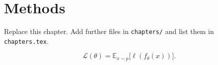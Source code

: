 \chapter{Methods}
\label{ch:methods}

Replace this chapter. Add further files in \texttt{chapters/}
and list them in \texttt{chapters.tex}.

\begin{formulabox}
\[
  \mathcal{L}(\theta) = \mathbb{E}_{x\sim p}\bigl[\ell(f_\theta(x))\bigr].
\]
\end{formulabox}
